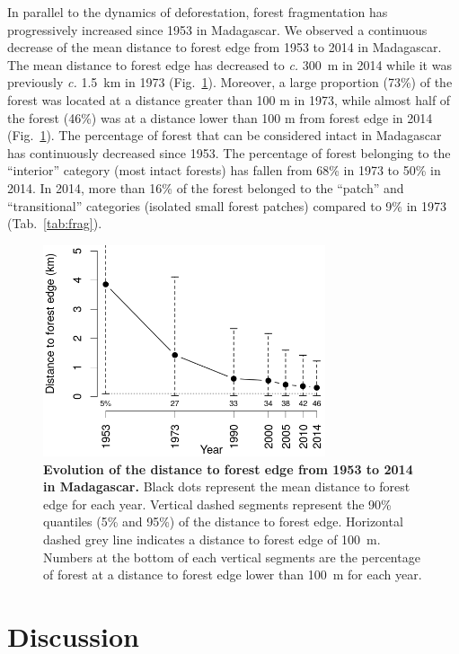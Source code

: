 \documentclass[essd, classical]{copernicus}
\begin{document}
In parallel to the dynamics of deforestation, forest fragmentation has
progressively increased since 1953 in Madagascar. We observed a
continuous decrease of the mean distance to forest edge from 1953 to
2014 in Madagascar. The mean distance to forest edge has decreased to
\emph{c.} 300~m in 2014 while it was previously \emph{c.} 1.5~km in 1973
(Fig.~\ref{fig:dist_edge}). Moreover, a large proportion (73\%) of
the forest was located at a distance greater than 100 m in 1973, while
almost half of the forest (46\%) was at a distance lower than 100 m
from forest edge in 2014 (Fig.~\ref{fig:dist_edge}). The percentage of
forest that can be considered intact in Madagascar has continuously
decreased since 1953. The percentage of forest belonging to the
``interior'' category (most intact forests) has fallen from 68\% in
1973 to 50\% in 2014. In 2014, more than 16\% of the forest belonged
to the ``patch'' and ``transitional'' categories (isolated small
forest patches) compared to 9\% in 1973 (Tab.~\ref{tab:frag}).

\begin{figure}[h]
  \centering
  
  \includegraphics[width=8.3cm]{dist.png}
  
  \caption{\textbf{Evolution of the distance to forest edge from 1953
      to 2014 in Madagascar.} Black dots represent the mean distance
    to forest edge for each year. Vertical dashed segments represent
    the 90\% quantiles (5\% and 95\%) of the distance to forest
    edge. Horizontal dashed grey line indicates a distance to forest
    edge of 100~m.  Numbers at the bottom of each vertical segments are
    the percentage of forest at a distance to forest edge lower than
    100~m for each year.}

  \label{fig:dist_edge}

\end{figure}

\section{Discussion}
\label{discussion}
\end{document}
